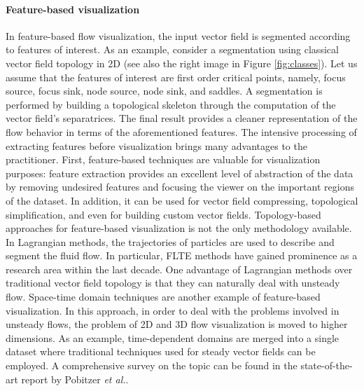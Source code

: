 \paragraph{Feature-based visualization} 
%
In feature-based flow visualization, the input vector field is segmented according to features of interest. 
%
As an example, consider a segmentation using classical vector field topology in 2D\cite{Helman:1989:RDV:72885.72887} (see also the right image in Figure \ref{fig:classes}). 
%
Let us assume that the features of interest are first order critical points, namely, focus source, focus sink, node source, node sink, and saddles. 
%
A segmentation is performed by building a topological skeleton through the computation of the vector field's separatrices.
%
The final result provides a cleaner representation of the flow behavior in terms of the aforementioned features.
%
The intensive processing of extracting features before visualization brings many advantages to the practitioner.
%
First, feature-based techniques are valuable for visualization purposes: 
%
feature extraction provides an excellent level of abstraction of the data by removing undesired features and focusing the viewer on the important regions of the dataset.
%
In addition, it can be used for vector field compressing, topological simplification, and even for building custom vector fields\cite{theisel2008}. 
%
Topology-based approaches for feature-based visualization is not the only methodology available.
%
In Lagrangian methods, the trajectories of particles are used to describe and segment the fluid flow.
%
In particular, FLTE\cite{Haller:2001:DMS:370169.370176} methods have gained prominence as a research area within the last decade.
%
One advantage of Lagrangian methods over traditional vector field topology is that they can naturally deal with unsteady flow\cite{CGF:CGF1901}. 
%
Space-time domain techniques are another example of feature-based visualization.
%
In this approach, in order to deal with the problems involved in unsteady flows, the problem of 2D and 3D flow visualization is moved to higher dimensions.
%
As an example, time-dependent domains are merged into a single dataset where traditional techniques used for steady vector fields can be employed.
%
A comprehensive survey on the topic can be found in the state-of-the-art report by Pobitzer \emph{et al.}\cite{CGF:CGF1901}.


